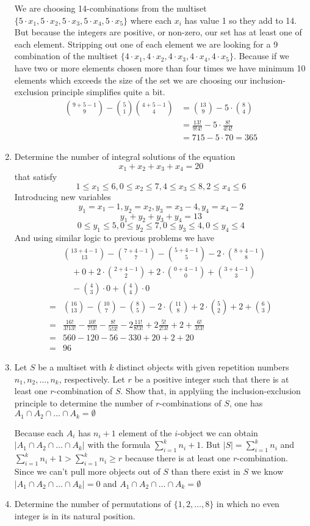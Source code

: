 \documentclass{article}
\begin{document}
\begin{enumerate}
We are choosing 14-combinations from the multiset $\{5\cdot x_1,5\cdot x_2,5\cdot x_3,5\cdot x_4,5\cdot x_5\}$ where each $x_i$ has value 1 so they add to 14. But because the integers are positive, or non-zero, our set has at least one of each element. Stripping out one of each element we are looking for a 9 combination of the multiset $\{4\cdot x_1,4\cdot x_2,4\cdot x_3,4\cdot x_4,4\cdot x_5\}$. Because if we have two or more elements chosen more than four times we have minimum 10 elements which exceeds the size of the set we are choosing our inclusion-exclusion principle simplifies quite a bit.
\begin{align*}
  \binom{9+5-1}{9}-\binom{5}{1}\binom{4+5-1}{4}&=\binom{13}{9}-5\cdot\binom{8}{4}\\
  &=\frac{13!}{9!4!}-5\cdot\frac{8!}{4!4!}\\
  &=715-5\cdot 70=365
\end{align*}
\item
Determine the number of integral solutions of the equation
\[x_1+x_2+x_3+x_4=20\]
that satisfy
\[1\le x_1\le6,0\le x_2\le7,4\le x_3\le8,2\le x_4\le 6\]
Introducing new variables
\[y_1=x_1-1,y_2=x_2,y_3=x_3-4,y_4=x_4-2\]
\[y_1+y_2+y_3+y_4=13\]
\[0\le y_1\le 5,0\le y_2\le 7,0\le y_3\le 4,0\le y_4\le 4\]
And using similar logic to previous problems we have
\begin{align*}
  &\binom{13+4-1}{13}-\binom{7+4-1}{7}-\binom{5+4-1}{5}-2\cdot\binom{8+4-1}{8}\\
  &\quad+0+2\cdot\binom{2+4-1}{2}+2\cdot\binom{0+4-1}{0}+\binom{3+4-1}{3}\\
  &\quad-\binom{4}{3}\cdot0+\binom{4}{4}\cdot0\\
  =&\binom{16}{13}-\binom{10}{7}-\binom{8}{5}-2\cdot\binom{11}{8}+2\cdot\binom{5}{2}+2+\binom{6}{3}\\
  =&\frac{16!}{3!13!}-\frac{10!}{7!3!}-\frac{8!}{5!3!}-2\frac{11!}{8!3!}+2\frac{5!}{2!3!}+2+\frac{6!}{3!3!}\\
  =&560-120-56-330+20+2+20\\
  =&96
\end{align*}
\item
Let $S$ be a multiset with $k$ distinct objects with given repetition numbers $n_1,n_2,\dots,n_k$, respectively.
Let $r$ be a positive integer such that there is at least one $r$-combination of $S$.
Show that, in applyiing the inclusion-exclusion principle to determine the number of $r$-combinations of $S$, one has $A_1\cap A_2\cap\dots\cap A_k=\emptyset$

Because each $A_i$ has $n_i+1$ element of the $i$-object we can obtain $\left\lvert A_1\cap A_2\cap\dots\cap A_k\right\rvert$ with the formula $\sum\limits_{i=1}^k{n_i+1}$. But $\left\lvert S\right\rvert=\sum\limits_{i=1}^k{n_i}$ and $\sum\limits_{i=1}^k{n_i+1}>\sum\limits_{i=1}^k{n_i}\ge r$ because there is at least one $r$-combination. Since we can't pull more objects out of $S$ than there exist in $S$ we know $\left\lvert A_1\cap A_2\cap\dots\cap A_k\right\rvert=0$ and $A_1\cap A_2\cap\dots\cap A_k=\emptyset$
\item
Determine the number of permutations of $\{1,2,\dots,8\}$ in which no even integer is in its natural position.


\end{enumerate}
\end{document}

